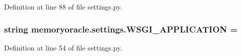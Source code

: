 Definition at line 88 of file settings.\+py.

\hypertarget{namespacememoryoracle_1_1settings_ad4789b93d4ce7e968b078d08624ec529}{}
\subsubsection[{W\+S\+G\+I\+\_\+\+A\+P\+P\+L\+I\+C\+A\+T\+I\+O\+N}]{\setlength{\rightskip}{0pt plus 5cm}string memoryoracle.\+settings.\+W\+S\+G\+I\+\_\+\+A\+P\+P\+L\+I\+C\+A\+T\+I\+O\+N = \textquotesingle{}}\label{namespacememoryoracle_1_1settings_ad4789b93d4ce7e968b078d08624ec529}


Definition at line 54 of file settings.\+py.

